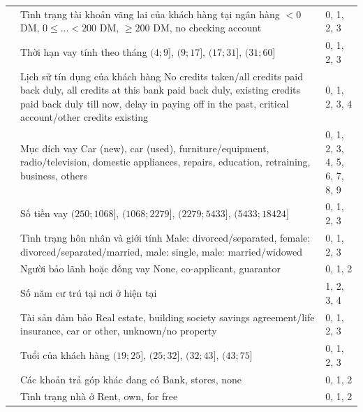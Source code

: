 \begin{longtable}{V{2.9cm}D{9.3cm}S{2.4cm}}
     & Tình trạng tài khoản vãng lai của khách hàng tại ngân hàng \newline $< 0$ DM, $0 \leq \dots < 200$ DM, $\geq 200$ DM, no checking account & 0, 1, 2, 3 \\
     & Thời hạn vay tính theo tháng \newline $(4; 9]$, $(9; 17]$, $(17; 31]$, $(31; 60]$ & 0, 1, 2, 3 \\
     & Lịch sử tín dụng của khách hàng \newline No credits taken/all credits paid back duly, all credits at this bank paid back duly, existing credits paid back duly till now, delay in paying off in the past, critical account/other credits existing & 0, 1, 2, 3, 4 \\
     & Mục đích vay \newline Car (new), car (used), furniture/equipment, radio/television, domestic appliances, repairs, education, retraining, business, others & 0, 1, 2, 3, 4, 5, 6, 7, 8, 9 \\
     & Số tiền vay \newline $(250; 1068]$, $(1068; 2279]$, $(2279; 5433]$, $(5433; 18424]$ & 0, 1, 2, 3 \\
     & Tình trạng hôn nhân và giới tính \newline Male: divorced/separated, female: divorced/separated/married, male: single, male: married/widowed & 0, 1, 2, 3 \\
     & Người bảo lãnh hoặc đồng vay \newline None, co-applicant, guarantor & 0, 1, 2 \\
     & Số năm cư trú tại nơi ở hiện tại & 1, 2, 3, 4 \\
     & Tài sản đảm bảo \newline Real estate, building society savings agreement/life insurance, car or other, unknown/no property & 0, 1, 2, 3 \\
     & Tuổi của khách hàng \newline $(19; 25]$, $(25; 32]$, $(32; 43]$, $(43; 75]$ & 0, 1, 2, 3 \\
     & Các khoản trả góp khác đang có \newline Bank, stores, none & 0, 1, 2 \\
     & Tình trạng nhà ở \newline Rent, own, for free & 0, 1, 2 \\

\end{longtable}

